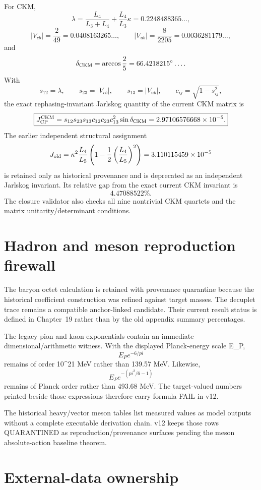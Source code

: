 \documentclass[11pt,a4paper,twoside]{book}
\def\({}%
\def\){}%
\def\pi{pi}%
\theoremstyle{definition}
\begin{document}
For CKM,
\[
\lambda
=\frac{L_4}{L_3+L_4}
+\frac{L_4}{L_3}\kappa
=0.2248488365\ldots,
\]
\[
|V_{cb}|=\frac2{49}=0.0408163265\ldots,
\qquad
|V_{ub}|=\frac8{2205}=0.0036281179\ldots,
\]
and
\[
\delta_{\rm CKM}=\arccos\frac25=66.4218215^\circ\ldots .
\]
With
\[
s_{12}=\lambda,\qquad s_{23}=|V_{cb}|,\qquad s_{13}=|V_{ub}|,
\qquad c_{ij}=\sqrt{1-s_{ij}^2},
\]
the exact rephasing-invariant Jarlskog quantity of the current CKM matrix is
\[
\boxed{
J_{\rm CP}^{\rm CKM}
=s_{12}s_{23}s_{13}c_{12}c_{23}c_{13}^2\sin\delta_{\rm CKM}
=2.97106576668\times10^{-5}.
}
\]
The earlier independent structural assignment
\[
J_{\rm old}
=\kappa^2\frac{L_4}{L_5}
\left(1-\frac12\left(\frac{L_4}{L_5}\right)^2\right)
=3.110115459\times10^{-5}
\]
is retained only as historical provenance and is deprecated as an independent
Jarlskog invariant.  Its relative gap from the exact current CKM invariant is
\[
4.47088522\%.
\]
The closure validator also checks all nine nontrivial CKM quartets and the
matrix unitarity/determinant conditions.

\section{Hadron and meson reproduction firewall}

The baryon octet calculation is retained with provenance quarantine because
the historical coefficient construction was refined against target masses.
The decuplet trace remains a compatible anchor-linked candidate.  Their
current result status is defined in Chapter~19 rather than by the old appendix
summary percentages.

The legacy pion and kaon exponentials contain an immediate dimensional/arithmetic
witness.  With the displayed Planck-energy scale \(E_P\),
\[
E_Pe^{-6/\pi}
\]
remains of order \(10^{21}\) MeV rather than \(139.57\) MeV.  Likewise,
\[
E_Pe^{-(\pi^2/6-1)}
\]
remains of Planck order rather than \(493.68\) MeV.  The target-valued numbers
printed beside those expressions therefore carry formula FAIL in v12.

The historical heavy/vector meson tables list measured values as model outputs
without a complete executable derivation chain.  v12 keeps those rows
QUARANTINED as reproduction/provenance surfaces pending the meson absolute-action
baseline theorem.

\section{External-data ownership}
\end{document}
